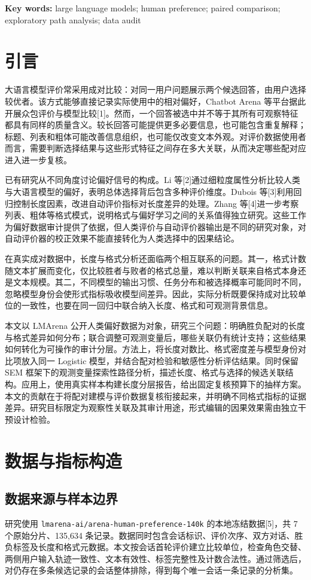 \documentclass[UTF8,11pt,a4paper,fontset=windows]{ctexart}
\numberwithin{equation}{section}
\begin{document}
\noindent\textbf{Key words:} large language models; human preference; paired comparison; exploratory path analysis; data audit

\section{引言}
大语言模型评价常采用成对比较：对同一用户问题展示两个候选回答，由用户选择较优者。该方式能够直接记录实际使用中的相对偏好，Chatbot Arena 等平台据此开展众包评价与模型比较[1]。然而，一个回答被选中并不等于其所有可观察特征都具有同样的质量含义。较长回答可能提供更多必要信息，也可能包含重复解释；标题、列表和粗体可能改善信息组织，也可能仅改变文本外观。对评价数据使用者而言，需要判断选择结果与这些形式特征之间存在多大关联，从而决定哪些配对应进入进一步复核。

已有研究从不同角度讨论偏好信号的构成。Li 等[2]通过细粒度属性分析比较人类与大语言模型的偏好，表明总体选择背后包含多种评价维度。Dubois 等[3]利用回归控制长度因素，改进自动评价指标对长度差异的处理。Zhang 等[4]进一步考察列表、粗体等格式模式，说明格式与偏好学习之间的关系值得独立研究。这些工作为偏好数据审计提供了依据，但人类评价与自动评价器输出是不同的研究对象，对自动评价器的校正效果不能直接转化为人类选择中的因果结论。

在真实成对数据中，长度与格式分析还面临两个相互联系的问题。其一，格式计数随文本扩展而变化，仅比较胜者与败者的格式总量，难以判断关联来自格式本身还是文本规模。其二，不同模型的输出习惯、任务分布和被选择概率可能同时不同，忽略模型身份会使形式指标吸收模型间差异。因此，实际分析既要保持成对比较单位的一致性，也要在同一回归中联合纳入长度、格式和可观测背景信息。

本文以 LMArena 公开人类偏好数据为对象，研究三个问题：明确胜负配对的长度与格式差异如何分布；联合调整可观测变量后，哪些关联仍有统计支持；这些结果如何转化为可操作的审计分层。方法上，将长度对数比、格式密度差与模型身份对比项放入同一 Logistic 模型，并结合配对检验和敏感性分析评估结果。同时保留 SEM 框架下的观测变量探索性路径分析，描述长度、格式与选择的候选关联结构。应用上，使用真实样本构建长度分层报告，给出固定复核预算下的抽样方案。本文的贡献在于将配对建模与评价数据复核衔接起来，并明确不同格式指标的证据差异。研究目标限定为观察性关联及其审计用途，形式编辑的因果效果需由独立干预设计检验。

\section{数据与指标构造}
\subsection{数据来源与样本边界}
研究使用 \texttt{lmarena-ai/arena-human-preference-140k} 的本地冻结数据[5]，共 7 个原始分片、135,634 条记录。数据同时包含会话标识、评价次序、双方对话、胜负标签及长度和格式元数据。本文按会话首轮评价建立比较单位，检查角色交替、两侧用户输入轨迹一致性、文本有效性、标签完整性及计数合法性。通过筛选后，对仍存在多条候选记录的会话整体排除，得到每个唯一会话一条记录的分析集。
\end{document}
